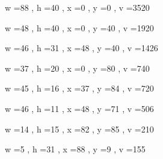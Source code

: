 \documentclass[11pt]{article}
\begin{document}
w =88 , h =40 , x =0 , y =0 , v =3520
\par
w =48 , h =40 , x =0 , y =40 , v =1920
\par
w =46 , h =31 , x =48 , y =40 , v =1426
\par
w =37 , h =20 , x =0 , y =80 , v =740
\par
w =45 , h =16 , x =37 , y =84 , v =720
\par
w =46 , h =11 , x =48 , y =71 , v =506
\par
w =14 , h =15 , x =82 , y =85 , v =210
\par
w =5 , h =31 , x =88 , y =9 , v =155
\par
\newpage
\end{document}
